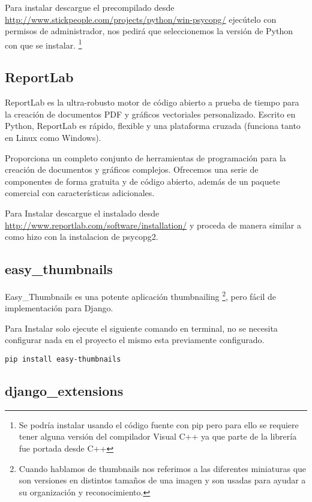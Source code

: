 Para instalar descargue el precompilado desde \url{http://www.stickpeople.com/projects/python/win-psycopg/} ejecútelo con permisos de administrador, nos pedirá que seleccionemos la versión de Python con que se instalar. \footnote{Se podría instalar usando el código fuente con pip pero para ello se requiere tener alguna versión del compilador Visual C++ ya que parte de la librería fue portada desde C++}

\subsection{ReportLab}

ReportLab es la ultra-robusto motor de código abierto a prueba de tiempo para la creación de documentos PDF y gráficos vectoriales personalizado. Escrito en Python, ReportLab es rápido, flexible y una plataforma cruzada (funciona tanto en Linux como Windows).
 
Proporciona un completo conjunto de herramientas de programación para la creación de documentos y gráficos complejos. Ofrecemos una serie de componentes de forma gratuita y de código abierto, además de un paquete comercial con características adicionales.

Para Instalar descargue el instalado desde \url{http://www.reportlab.com/software/installation/} y proceda de manera similar a como hizo con la instalacion de psycopg2.


\subsection{easy\_thumbnails}

Easy\_Thumbnails es una potente aplicación thumbnailing \footnote{Cuando hablamos de thumbnails nos referimos a las diferentes miniaturas que son versiones en distintos tamaños  de una imagen y son usadas para ayudar a su organización y reconocimiento.}, pero fácil de implementación para Django.

Para Instalar solo ejecute el siguiente comando en terminal, no se necesita configurar nada en el proyecto el mismo esta previamente configurado.

\begin{lstlisting}[style=consola]
    pip install easy-thumbnails
\end{lstlisting}
\vspace{0.1cm}

\subsection{django\_extensions}

